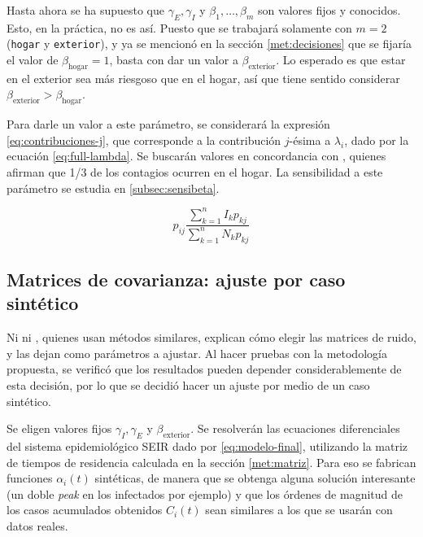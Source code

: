 Hasta ahora se ha supuesto que \(\gamma_E, \gamma_I\) y \(\beta_1, \dots, \beta_m\) son valores fijos y conocidos. Esto, en la práctica, no es así. Puesto que se trabajará solamente con \(m= 2\) (\texttt{hogar} y \texttt{exterior}), y ya se mencionó en la sección \ref{met:decisiones} que se fijaría el valor de \(\beta_{\text{hogar}} = 1\), basta con dar un valor a \(\beta_{\text{exterior}}\). Lo esperado es que estar en el exterior sea más riesgoso que en el hogar, así que tiene sentido considerar \(\beta_{\text{exterior}} > \beta_{\text{hogar}}\). 

Para darle un valor a este parámetro, se considerará la expresión \ref{eq:contribuciones-j}, que corresponde a la contribución \(j\)-ésima a \(\lambda_i\), dado por la ecuación \ref{eq:full-lambda}. Se buscarán valores en concordancia con \cite{Ferguson2020}\cite{Mossong2008}, quienes afirman que 1/3 de los contagios ocurren en el hogar. La sensibilidad a este parámetro se estudia en \ref{subsec:sensibeta}.

\begin{equation}\label{eq:contribuciones-j}
 p_{ij} \frac{\sum_{k = 1}^n I_{k} p_{kj}}{\sum_{k = 1}^n N_{k} p_{kj}}
\end{equation}




\subsection{Matrices de covarianza: ajuste por caso sintético}\label{met-subsec:sintetico}

Ni \cite{Hasan2020} ni \cite{Sameni2020}, quienes usan métodos similares, explican cómo elegir las matrices de ruido, y las dejan como parámetros a ajustar. Al hacer pruebas con la metodología propuesta, se verificó que los resultados pueden depender considerablemente de esta decisión, por lo que se decidió hacer un ajuste por medio de un caso sintético.


Se eligen valores fijos \(\gamma_I, \gamma_E\) y \(\beta_{\text{exterior}}\). Se resolverán las ecuaciones diferenciales del sistema epidemiológico SEIR dado por \ref{eq:modelo-final}, utilizando la matriz de tiempos de residencia calculada en la sección \ref{met:matriz}. Para eso se fabrican funciones \(\alpha_i(t)\) sintéticas, de manera que se obtenga alguna solución interesante (un doble \textit{peak} en los infectados por ejemplo) y que los órdenes de magnitud de los casos acumulados obtenidos \(C_i(t)\) sean similares a los que se usarán con datos reales.

